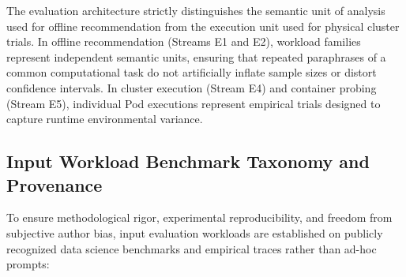 The evaluation architecture strictly distinguishes the semantic unit of analysis used for offline recommendation from the execution unit used for physical cluster trials. In offline recommendation (Streams E1 and E2), workload families represent independent semantic units, ensuring that repeated paraphrases of a common computational task do not artificially inflate sample sizes or distort confidence intervals. In cluster execution (Stream E4) and container probing (Stream E5), individual Pod executions represent empirical trials designed to capture runtime environmental variance.

\subsection{Input Workload Benchmark Taxonomy and Provenance}
\label{subsec:workload_taxonomy}

To ensure methodological rigor, experimental reproducibility, and freedom from subjective author bias, input evaluation workloads are established on publicly recognized data science benchmarks and empirical traces rather than ad-hoc prompts:

